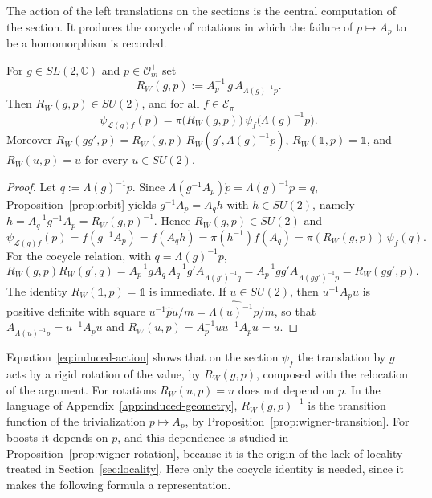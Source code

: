	The action of the left translations on the sections is the central computation of the section. It produces the cocycle of rotations in which the failure of $p\mapsto A_p$ to be a homomorphism is recorded.
	
	\begin{proposition}\label{prop:induced-action}
		For $g\in SL(2,\mathbb{C})$ and $p\in\mathcal{O}_m^+$ set
		\begin{equation}\label{eq:wigner-rotation}
			R_W(g,p):=A_p^{-1}\,g\,A_{\Lambda(g)^{-1}p}.
		\end{equation}
		Then $R_W(g,p)\in SU(2)$, and for all $f\in\mathcal{E}_\pi$
		\begin{equation}\label{eq:induced-action}
			\psi_{\mathcal{L}(g)f}(p)=\pi\big(R_W(g,p)\big)\,\psi_f\big(\Lambda(g)^{-1}p\big).
		\end{equation}
		Moreover $R_W(gg',p)=R_W(g,p)\,R_W(g',\Lambda(g)^{-1}p)$, $R_W(\mathbb{1},p)=\mathbb{1}$, and $R_W(u,p)=u$ for every $u\in SU(2)$.
	\end{proposition}
	
	\begin{proof}
		Let $q:=\Lambda(g)^{-1}p$. Since $\Lambda(g^{-1}A_p)\mathring{p}=\Lambda(g)^{-1}p=q$, Proposition~\ref{prop:orbit} yields $g^{-1}A_p=A_qh$ with $h\in SU(2)$, namely $h=A_q^{-1}g^{-1}A_p=R_W(g,p)^{-1}$. Hence $R_W(g,p)\in SU(2)$ and
		\begin{equation*}
			\psi_{\mathcal{L}(g)f}(p)=f(g^{-1}A_p)=f(A_qh)=\pi(h^{-1})f(A_q)=\pi(R_W(g,p))\,\psi_f(q).
		\end{equation*}
		For the cocycle relation, with $q=\Lambda(g)^{-1}p$,
		\begin{equation*}
			R_W(g,p)R_W(g',q)=A_p^{-1}gA_q\,A_q^{-1}g'A_{\Lambda(g')^{-1}q}=A_p^{-1}gg'A_{\Lambda(gg')^{-1}p}=R_W(gg',p).
		\end{equation*}
		The identity $R_W(\mathbb{1},p)=\mathbb{1}$ is immediate. If $u\in SU(2)$, then $u^{-1}A_pu$ is positive definite with square $u^{-1}\hat{p}u/m=\widehat{\Lambda(u)^{-1}p}/m$, so that $A_{\Lambda(u)^{-1}p}=u^{-1}A_pu$ and $R_W(u,p)=A_p^{-1}uu^{-1}A_pu=u$.
	\end{proof}
	
	Equation~\eqref{eq:induced-action} shows that on the section $\psi_f$ the translation by $g$ acts by a rigid rotation of the value, by $R_W(g,p)$, composed with the relocation of the argument. For rotations $R_W(u,p)=u$ does not depend on $p$. In the language of Appendix~\ref{app:induced-geometry}, $R_W(g,p)^{-1}$ is the transition function of the trivialization $p\mapsto A_p$, by Proposition~\ref{prop:wigner-transition}. For boosts it depends on $p$, and this dependence is studied in Proposition~\ref{prop:wigner-rotation}, because it is the origin of the lack of locality treated in Section~\ref{sec:locality}. Here only the cocycle identity is needed, since it makes the following formula a representation.
	

